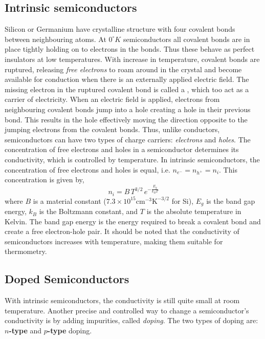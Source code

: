 \subsection{Intrinsic semiconductors}
Silicon or Germanium have crystalline structure with four covalent bonds between neighbouring atoms. At $0^\circ K$ semiconductors all covalent bonds are in place tightly holding on to electrons in the bonds. Thus these behave as perfect insulators at low temperatures. With increase in temperature, covalent bonds are ruptured, releasing \textit{free electrons} to roam around in the crystal and become available for conduction when there is an externally applied electric field. The missing electron in the ruptured covalent bond is called a , which too act as a carrier of electricity. When an electric field is applied, electrons from neighbouring covalent bonds jump into a hole creating a hole in their previous bond. This results in the hole effectively moving the direction opposite to the jumping electrons from the covalent bonds. Thus, unlike conductors, semiconductors can have two types of charge carriers: \textit{electrons} and \textit{holes}. The concentration of free electrons and holes in a semiconductor determines its conductivity, which is controlled by temperature. In intrinsic semiconductors, the concentration of free electrons and holes is equal, i.e. $n_{e^-} = n_{h^+} = n_i$. This concentration is given by,
\begin{equation}
    n_i = B \, T^{3/2} \, e^{-\frac{E_g}{k_B T}}
    \label{eq:ch03-intrinsic-elec-conc}
\end{equation}
where $B$ is a material constant ($7.3 \times 10^15 \text{cm}^{-3}\text{K}^{-3/2}$ for Si), $E_g$ is the band gap energy, $k_B$ is the Boltzmann constant, and $T$ is the absolute temperature in Kelvin. The band gap energy is the energy required to break a covalent bond and create a free electron-hole pair. It should be noted that the conductivity of semiconductors increases with temperature, making them suitable for thermometry.

\subsection{Doped Semiconductors}
With intrinsic semiconductors, the conductivity is still quite small at room temperature. Another precise and controlled way to change a semiconductor's conductivity is by adding impurities, called \textit{doping}. The two types of doping are: \textbf{$n$-type} and \textbf{$p$-type} doping. 

